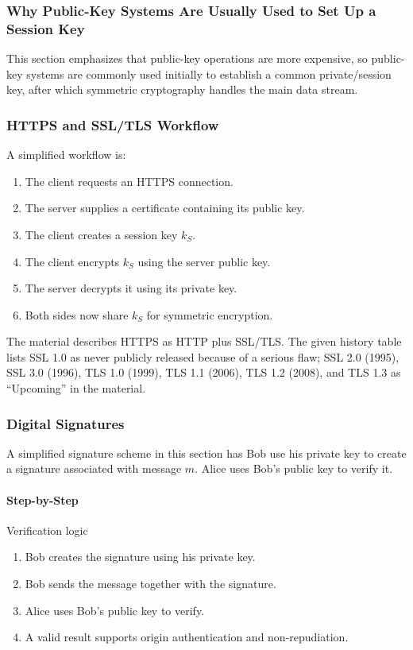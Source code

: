 \documentclass[12pt]{article}
\newcommand{\Step}{\paragraph{Step-by-Step}}
\begin{document}
\subsubsection{Why Public-Key Systems Are Usually Used to Set Up a Session Key}
This section emphasizes that public-key operations are more expensive, so public-key systems are commonly used initially to establish a common private/session key, after which symmetric cryptography handles the main data stream.

\subsubsection{HTTPS and SSL/TLS Workflow}
A simplified workflow is:
\begin{enumerate}
    \item The client requests an HTTPS connection.
    \item The server supplies a certificate containing its public key.
    \item The client creates a session key $k_S$.
    \item The client encrypts $k_S$ using the server public key.
    \item The server decrypts it using its private key.
    \item Both sides now share $k_S$ for symmetric encryption.
\end{enumerate}
The material describes HTTPS as HTTP plus SSL/TLS. The given history table lists SSL 1.0 as never publicly released because of a serious flaw; SSL 2.0 (1995), SSL 3.0 (1996), TLS 1.0 (1999), TLS 1.1 (2006), TLS 1.2 (2008), and TLS 1.3 as ``Upcoming'' in the material.

\subsubsection{Digital Signatures}
A simplified signature scheme in this section has Bob use his private key to create a signature associated with message $m$. Alice uses Bob's public key to verify it.

\Step{Verification logic}
\begin{enumerate}
    \item Bob creates the signature using his private key.
    \item Bob sends the message together with the signature.
    \item Alice uses Bob's public key to verify.
    \item A valid result supports origin authentication and non-repudiation.
\end{enumerate}
\end{document}
